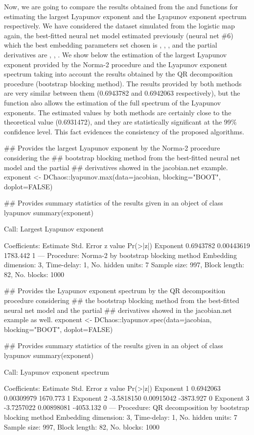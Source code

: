 Now, we are going to compare the results obtained from the  and  functions for estimating the largest Lyapunov exponent and the Lyapunov exponent spectrum respectively. We have considered the dataset simulated from the logistic map again, the best-fitted neural net model estimated previously (neural net $\#$6) which the best embedding parameters set chosen is , , , and the partial derivatives are , , . We show below the estimation of the largest Lyapunov exponent provided by the Norma-2 procedure and the Lyapunov exponent spectrum taking into account the results obtained by the QR decomposition procedure (bootstrap blocking method). The results provided by both methods are very similar between them (0.6943782 and 0.6942063 respectively), but the function also allows the estimation of the full spectrum of the Lyapunov exponents. The estimated values by both methods are certainly close to the theoretical value (0.6931472), and they are statistically significant at the 99$\%$ confidence level. This fact evidences the consistency of the proposed algorithms.
\newpage
\begin{example}
## Provides the largest Lyapunov exponent by the Norma-2 procedure considering the
## bootstrap blocking method from the best-fitted neural net model and the partial
## derivatives showed in the jacobian.net example.
exponent <- DChaos::lyapunov.max(data=jacobian, blocking="BOOT", doplot=FALSE) 

## Provides summary statistics of the results given in an object of class lyapunov
summary(exponent)

Call:
Largest Lyapunov exponent 

Coefficients:
             Estimate Std. Error   z value Pr(>|z|)
Exponent    0.6943782 0.00443619  1783.442        1
---
Procedure: Norma-2 by bootstrap blocking method 
Embedding dimension: 3, Time-delay: 1, No. hidden units: 7
Sample size: 997, Block length: 82, No. blocks: 1000

## Provides the Lyapunov exponent spectrum by the QR decomposition procedure considering
## the bootstrap blocking method from the best-fitted neural net model and the partial 
## derivatives showed  in the jacobian.net example as well.
exponent <- DChaos::lyapunov.spec(data=jacobian, blocking="BOOT", doplot=FALSE) 

## Provides summary statistics of the results given in an object of class lyapunov
summary(exponent)

Call:
Lyapunov exponent spectrum 

Coefficients: 
             Estimate Std. Error   z value Pr(>|z|)
Exponent 1  0.6942063 0.00309979  1670.773        1
Exponent 2 -3.5818150 0.00915042 -3873.927        0
Exponent 3 -3.7257022 0.00898081 -4053.132        0
---
Procedure: QR decomposition by bootstrap blocking method 
Embedding dimension: 3, Time-delay: 1, No. hidden units: 7
Sample size: 997, Block length: 82, No. blocks: 1000
\end{example}

